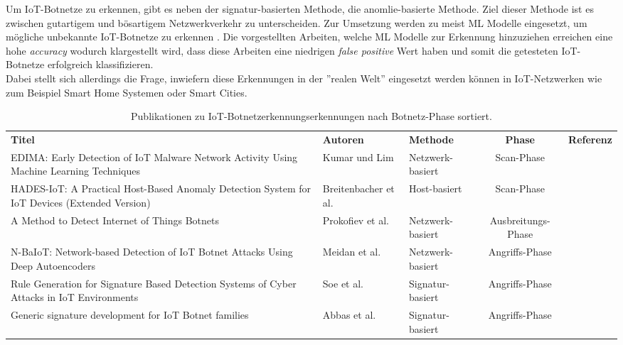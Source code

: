 Um IoT-Botnetze zu erkennen, gibt es neben der signatur-basierten Methode, die anomlie-basierte Methode. Ziel dieser Methode ist es zwischen gutartigem und bösartigem Netzwerkverkehr zu unterscheiden. Zur Umsetzung werden zu meist ML Modelle eingesetzt, um mögliche unbekannte IoT-Botnetze zu erkennen \cite{Wazzan2021InternetOT}. Die vorgestellten Arbeiten, welche ML Modelle zur Erkennung hinzuziehen erreichen eine hohe \textit{accuracy} wodurch klargestellt wird, dass diese Arbeiten eine niedrigen \textit{false positive} Wert haben und somit die getesteten IoT-Botnetze erfolgreich klassifizieren. \\ 

Dabei stellt sich allerdings die Frage, inwiefern diese Erkennungen in der ''realen Welt'' eingesetzt werden können in IoT-Netzwerken wie zum Beispiel Smart Home Systemen oder Smart Cities. 

\begin{center}
\begin{table}[ht]
    \begin{center}
    \begin{tabular}{p{5cm} m{2cm} m{2cm} c c}
       \textbf{Titel} & \textbf{Autoren} & \textbf{Methode} & \textbf{Phase} & \textbf{Referenz} \\
       \Xhline{4\arrayrulewidth}
        EDIMA: Early Detection of IoT Malware Network Activity Using Machine Learning Techniques & Kumar und Lim & Netzwerk-basiert & Scan-Phase & \cite{DBLP:journals/corr/abs-1906-09715} \\
        HADES-IoT: A Practical Host-Based Anomaly Detection System for IoT Devices (Extended Version) & Breitenbacher et al. & Host-basiert & Scan-Phase & \cite{DBLP:journals/corr/abs-1905-01027} \\
        A Method to Detect Internet of Things Botnets & Prokofiev et al. & Netzwerk-basiert & Ausbreitungs-Phase & \cite{Prokofiev_2018} \\
        N-BaIoT: Network-based Detection of IoT Botnet Attacks Using Deep Autoencoders & Meidan et al. & Netzwerk-basiert & Angriffs-Phase & \cite{DBLP:journals/pervasive/MeidanBMMSBE18} \\
        Rule Generation for Signature Based Detection Systems of Cyber Attacks in IoT Environments & Soe et al. & Signatur-basiert & Angriffs-Phase & \cite{BNCSS113} \\
        Generic signature development for IoT Botnet families & Abbas et al. & Signatur-basiert & Angriffs-Phase & \cite{DBLP:journals/di/AbbasHSZ21} \\
       \hline
    \end{tabular}
    \end{center}
    \caption{Publikationen zu IoT-Botnetzerkennungserkennungen nach Botnetz-Phase sortiert.}
    \label{tab:tech_paper}
\end{table}
\end{center}
